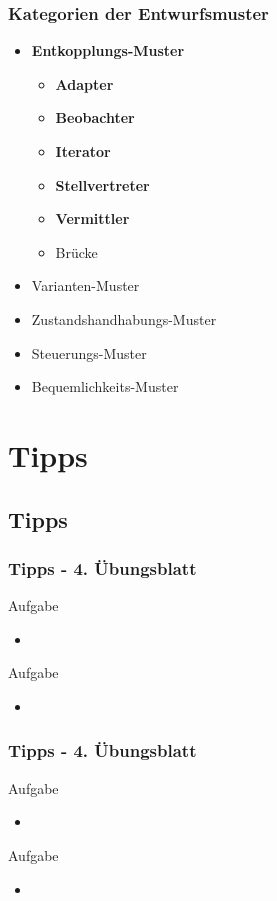 \documentclass[18pt]{beamer}
\begin{document}
	\begin{frame}
		\frametitle{Kategorien der Entwurfsmuster}
		\begin{itemize}
			\item \textbf{Entkopplungs-Muster}
				\begin{itemize}
					\item \textbf{Adapter}
					\item \textbf{Beobachter}
					\item \textbf{Iterator}
					\item \textbf{Stellvertreter}
					\item \textbf{Vermittler}
					\item Brücke
				\end{itemize}
			\item Varianten-Muster
			\item Zustandshandhabungs-Muster
			\item Steuerungs-Muster
			\item Bequemlichkeits-Muster
		\end{itemize}
	\end{frame}



\section{Tipps}
	\subsection{Tipps}
	\begin{frame}
		\frametitle{Tipps - 4. Übungsblatt}
			\begin{exampleblock}{Aufgabe}
				\begin{itemize}
					\item 	%
				\end{itemize}
			\end{exampleblock}
			\pause
			\begin{exampleblock}{Aufgabe}
				\begin{itemize}
					\item %
				\end{itemize}
			\end{exampleblock}
	\end{frame}

	\begin{frame}
		\frametitle{Tipps - 4. Übungsblatt}
			\begin{exampleblock}{Aufgabe}
				\begin{itemize}
					\item %
				\end{itemize}
			\end{exampleblock}
			\pause
			\begin{exampleblock}{Aufgabe}
				\begin{itemize}
					\item 	%
				\end{itemize}
			\end{exampleblock}
	\end{frame}
	
\end{document}
